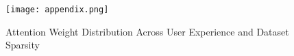 \documentclass[acmsmall]{acmart}
\begin{document}
\begin{figure}
    \centering
    \texttt{[image: appendix.png]}
    \caption{Attention Weight Distribution Across User Experience and Dataset Sparsity}
    \label{fig:attention over user experience}
\end{figure}
\end{document}
